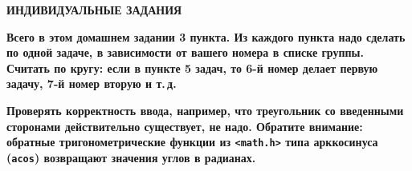 \documentclass{article}
\begin{document}
\bigskip\sloppy

\noindent\centerline{\textbf{ИНДИВИДУАЛЬНЫЕ ЗАДАНИЯ}}

\medskip
\textbf{
Всего в этом домашнем задании 3 пункта. Из каждого пункта надо сделать по одной задаче, в зависимости от вашего номера в списке группы. Считать по кругу: если в пункте 5 задач, то 6-й номер делает первую задачу, 7-й номер вторую и т.\,д.}

\textbf{Проверять корректность ввода, например, что треугольник со введенными сторонами действительно существует, не надо. Обратите внимание: обратные тригонометрические функции из \texttt{<math.h>} типа арккосинуса (\texttt{acos}) возвращают значения углов в радианах. 
}
\end{document}
